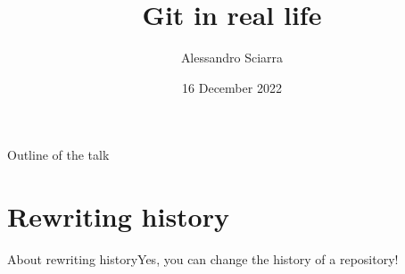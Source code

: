 \documentclass[usenames,svgnames,14pt]{beamer}
\title{Git in real life}
\date{16 December 2022}
\author{Alessandro Sciarra}
\institute{Z02~--~Software Development Center}
\begin{document}
\begin{frame}
    \titlepage
\end{frame}
\begin{frame}{Outline of the talk}
    \tableofcontents[subsectionstyle=hide]
\end{frame}


\section{Rewriting history}
\begin{frame}{About rewriting history}{Yes, you can change the history of a repository!}
\begin{overlayarea}{\textwidth}{0.3\textheight}


\end{overlayarea}
\end{frame}
\end{document}
